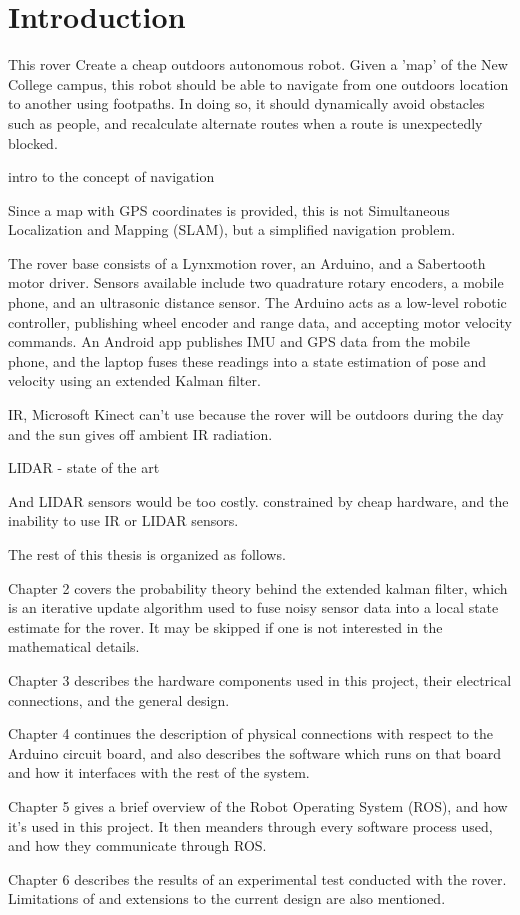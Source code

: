 \chapter{Introduction}

This rover 
Create a cheap outdoors autonomous robot. Given a 'map' of the New College campus, this robot should be able to navigate from one outdoors location to another using footpaths. In doing so, it should dynamically avoid obstacles such as people, and recalculate alternate routes when a route is unexpectedly blocked.

intro to the concept of navigation

Since a map with GPS coordinates is provided, this is not Simultaneous Localization and Mapping (SLAM), but a simplified navigation problem. 

The rover base consists of a Lynxmotion rover, an Arduino, and a Sabertooth motor driver. Sensors available include two quadrature rotary encoders, a mobile phone, and an ultrasonic distance sensor. The Arduino acts as a low-level robotic controller, publishing wheel encoder and range data, and accepting motor velocity commands. An Android app publishes IMU and GPS data from the mobile phone, and the laptop fuses these readings into a state estimation of pose and velocity using an extended Kalman filter.

IR, Microsoft Kinect
can't use because the rover will be outdoors during the day and the sun gives off ambient IR radiation.

LIDAR - state of the art

And LIDAR sensors would be too costly. constrained by cheap hardware, and the inability to use IR or LIDAR sensors.

The rest of this thesis is organized as follows.

Chapter 2 covers the probability theory behind the extended kalman filter, which is an iterative update algorithm used to fuse noisy sensor data into a local state estimate for the rover. It may be skipped if one is not interested in the mathematical details.

Chapter 3 describes the hardware components used in this project, their electrical connections, and the general design.

Chapter 4 continues the description of physical connections with respect to the Arduino circuit board, and also describes the software which runs on that board and how it interfaces with the rest of the system.

Chapter 5 gives a brief overview of the Robot Operating System (ROS), and how it's used in this project. It then meanders through every software process used, and how they communicate through ROS.

Chapter 6 describes the results of an experimental test conducted with the rover. Limitations of and extensions to the current design are also mentioned.